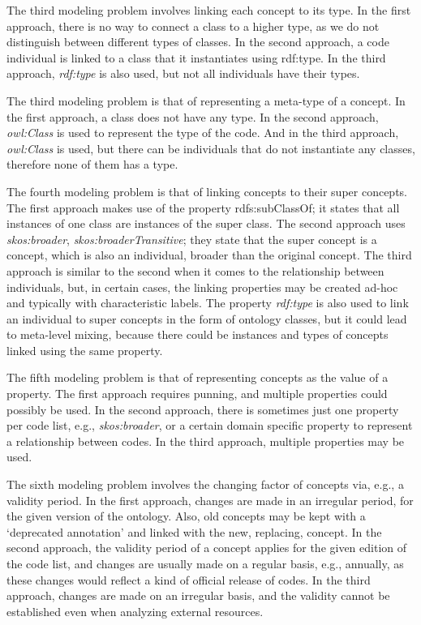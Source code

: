 The third modeling problem involves linking each concept to its type. In the first approach, there is no way to connect a class to a higher type, as we do not distinguish between different types of classes. In the second approach, a code individual is linked to a class that it instantiates using rdf:type. In the third approach, \textit{rdf:type} is also used, but not all individuals have their types.

The third modeling problem is that of representing a meta-type of a concept. In the first approach, a class does not have any type. In the second approach, \textit{owl:Class} is used to represent the type of the code. And in the third approach, \textit{owl:Class} is used, but there can be individuals that do not instantiate any classes, therefore none of them has a type.

The fourth modeling problem is that of linking concepts to their super concepts. The first approach makes use of the property rdfs:subClassOf; it states that all instances of one class are instances of the super class. The second approach uses \textit{skos:broader}, \textit{skos:broaderTransitive}; they state that the super concept is a concept, which is also an individual,  broader than the original concept. The third approach is similar to the second when it comes to the relationship between individuals, but, in certain cases, the linking properties may be created ad-hoc and typically with characteristic labels. The property \textit{rdf:type} is also used to link an individual to super concepts in the form of ontology classes, but it could lead to meta-level mixing, because there could be instances and types of  concepts linked using the same property.

The fifth modeling problem is that of representing concepts as the value of a property. The first approach requires punning, and  multiple properties could possibly be used. In the second approach, there is sometimes just one property per code list, e.g., \textit{skos:broader}, or a certain domain specific property to represent a relationship between codes. In the third approach, multiple properties may be used.

The sixth modeling problem involves the changing factor of concepts via, e.g., a validity period. In the first approach, changes are made in an irregular period, for the given version of the ontology. Also, old concepts may be kept with a `deprecated annotation' and linked with the new, replacing, concept. In the second approach, the validity period of a concept applies for the given edition of the code list, and changes are  usually made on a regular basis, e.g., annually, as these changes would reflect a kind of official release of codes. In the third approach, changes are made on an irregular basis, and  the validity cannot be established even when analyzing external resources.

